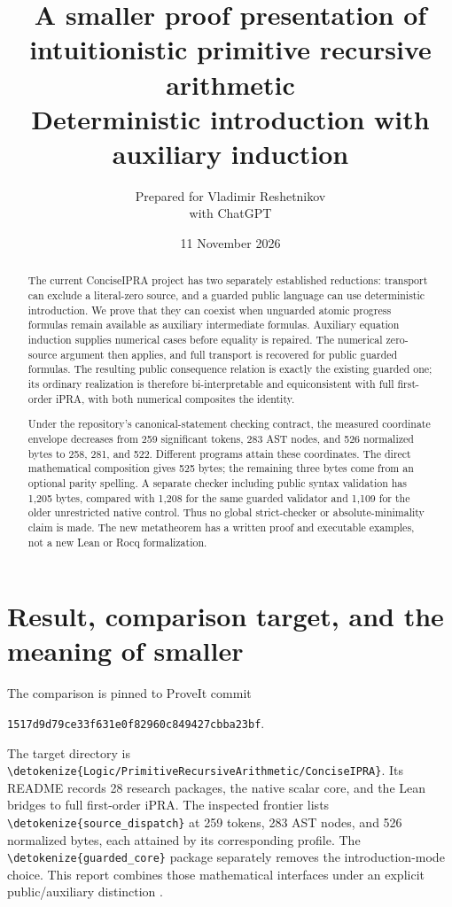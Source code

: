 \documentclass[11pt,letterpaper]{article}
\title{\color{ink}\bfseries A smaller proof presentation of\\intuitionistic primitive recursive arithmetic\\[7pt]
\large Deterministic introduction with auxiliary induction}
\author{Prepared for Vladimir Reshetnikov\\with ChatGPT}
\date{11 November 2026}
\theoremstyle{definition}\newtheorem{definition}[theorem]{Definition}
\theoremstyle{remark}\newtheorem{remark}[theorem]{Remark}
\newcommand{\file}[1]{\expandafter\nolinkurl\expandafter{\detokenize{#1}}}
\begin{document}
\maketitle
\begin{abstract}
The current ConciseIPRA project has two separately established reductions:
transport can exclude a literal-zero source, and a guarded public language
can use deterministic introduction. We prove that they can coexist when
unguarded atomic progress formulas remain available as auxiliary intermediate
formulas. Auxiliary equation induction supplies numerical cases before
equality is repaired. The numerical zero-source argument then applies, and
full transport is recovered for public guarded formulas. The resulting
public consequence relation is exactly the existing guarded one; its
ordinary realization is therefore bi-interpretable and equiconsistent with
full first-order iPRA, with both numerical composites the identity.

Under the repository's canonical-statement checking contract, the measured
coordinate envelope decreases from 259 significant tokens, 283 AST nodes,
and 526 normalized bytes to 258, 281, and 522. Different programs attain
these coordinates. The direct mathematical composition gives 525 bytes;
the remaining three bytes come from an optional parity spelling. A separate
checker including public syntax validation has 1,205 bytes, compared with
1,208 for the same guarded validator and 1,109 for the older unrestricted
native control. Thus no global strict-checker or absolute-minimality claim
is made. The new metatheorem has a written proof and executable examples,
not a new Lean or Rocq formalization.
\end{abstract}
\clearpage
\setcounter{tocdepth}{1}
\tableofcontents
\clearpage

\section{Result, comparison target, and the meaning of smaller}

The comparison is pinned to ProveIt commit
\begin{center}\small\texttt{1517d9d79ce33f631e0f82960c849427cbba23bf}.
\end{center}
The target directory is
\file{Logic/PrimitiveRecursiveArithmetic/ConciseIPRA}. Its README records
28 research packages, the native scalar core, and the Lean bridges to full
first-order iPRA. The inspected frontier lists \file{source_dispatch} at
259 tokens, 283 AST nodes, and 526 normalized bytes, each attained by its
corresponding profile. The \file{guarded_core} package separately removes
the introduction-mode choice. This report combines those mathematical
interfaces under an explicit public/auxiliary distinction
\cite{snapshot,source,guarded}.
\end{document}

